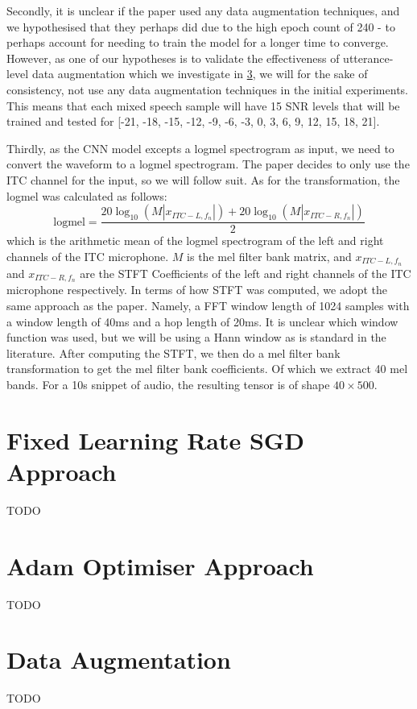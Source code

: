 \documentclass[logo,bsc,singlespacing,parskip,online]{infthesis}
\begin{document}
Secondly, it is unclear if the paper used any data augmentation techniques, and we 
hypothesised that they perhaps did due to the high epoch count of 240 - to perhaps 
account for needing to train the model for a longer time to converge. However,
as one of our hypotheses is to validate the effectiveness of utterance-level data 
augmentation which we investigate in \ref{sec:data-augmentation}, we will 
for the sake of consistency, not use any data augmentation techniques in the 
initial experiments. This means that each mixed speech sample will have 15
SNR levels that will be trained and tested for [-21, -18, -15, -12, -9, -6, -3, 0, 3, 6, 9, 12, 15, 18, 21].

Thirdly, as the CNN model excepts a logmel spectrogram as input, we need to convert the waveform
to a logmel spectrogram. The paper decides to only use the ITC channel for the input, so we 
will follow suit.
As for the transformation, the logmel was calculated as follows:
\[
\text{logmel} = \frac{20\log_{10}\left(M|x_{ITC-L, f_n}|\right) + 20\log_{10}\left(M|x_{ITC-R, f_n}|\right)}{2}
\]
which is the arithmetic mean of the logmel spectrogram of the left and right channels of the ITC microphone.
$M$ is the mel filter bank matrix, and $x_{ITC-L, f_n}$ and $x_{ITC-R, f_n}$ are
the STFT Coefficients of the left and right channels of the ITC microphone respectively.
In terms of how STFT was computed, we adopt the same approach as the paper. Namely, 
a FFT window length of 1024 samples with a window length of 40ms and a hop length of 20ms. It is 
unclear which window function was used, but we will be using a Hann window as is standard in the literature.
After computing the STFT, we then do a mel filter bank transformation to get the mel filter bank coefficients. 
Of which we extract 40 mel bands. For a 10s snippet of audio, the resulting tensor is of shape $40 \times 500$.

\section{Fixed Learning Rate SGD Approach}
TODO
\section{Adam Optimiser Approach}
TODO

\section{Data Augmentation}
\label{sec:data-augmentation}
TODO
\end{document}
